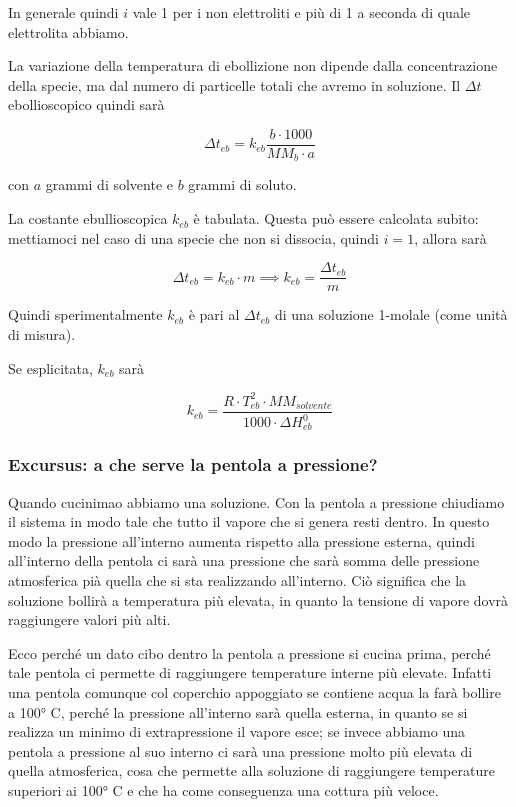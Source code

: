 In generale quindi $i$ vale 1 per i non elettroliti e più di 1 a seconda di quale elettrolita abbiamo.

\vspace{0.2cm}La variazione della temperatura di ebollizione non dipende dalla concentrazione della specie, ma dal numero di particelle totali che avremo in soluzione. Il $\Delta t$ ebollioscopico quindi sarà

$$\Delta t_{eb}=k_{eb} \frac{b \cdot 1000}{MM_b \cdot a}$$

con $a$ grammi di solvente e $b$ grammi di soluto.

La costante ebullioscopica $k_{eb}$ è tabulata. Questa può essere calcolata subito: mettiamoci nel caso di una specie che non si dissocia, quindi $i=1$, allora sarà

$$\Delta t_{eb}= k_{eb} \cdot m
\implies
k_{eb} = \frac{\Delta t_{eb}}{m}$$

Quindi sperimentalmente $k_{eb}$ è pari al $\Delta t_{eb}$ di una soluzione 1-molale (come unità di misura).

Se esplicitata, $k_{eb}$ sarà

$$k_{eb}=\frac{R \cdot T_{eb}^2 \cdot MM_{solvente}}{1000 \cdot \Delta H^0_{eb}}$$

\subsubsection{Excursus: a che serve la pentola a pressione?}
Quando cucinimao abbiamo una soluzione. Con la pentola a pressione chiudiamo il sistema in modo tale che tutto il vapore che si genera resti dentro. In questo modo la pressione all'interno aumenta rispetto alla pressione esterna, quindi all'interno della pentola ci sarà una pressione che sarà somma delle pressione atmosferica pià quella che si sta realizzando all'interno. Ciò significa che la soluzione bollirà a temperatura più elevata, in quanto la tensione di vapore dovrà raggiungere valori più alti.

Ecco perché un dato cibo dentro la pentola a pressione si cucina prima, perché tale pentola ci permette di raggiungere temperature interne più elevate. Infatti una pentola comunque col coperchio appoggiato se contiene acqua la farà bollire a 100° C, perché la pressione all'interno sarà quella esterna, in quanto se si realizza un minimo di extrapressione il vapore esce; se invece abbiamo una pentola a pressione al suo interno ci sarà una pressione molto più elevata di quella atmosferica, cosa che permette alla soluzione di raggiungere temperature superiori ai 100° C e che ha come conseguenza una cottura più veloce.
